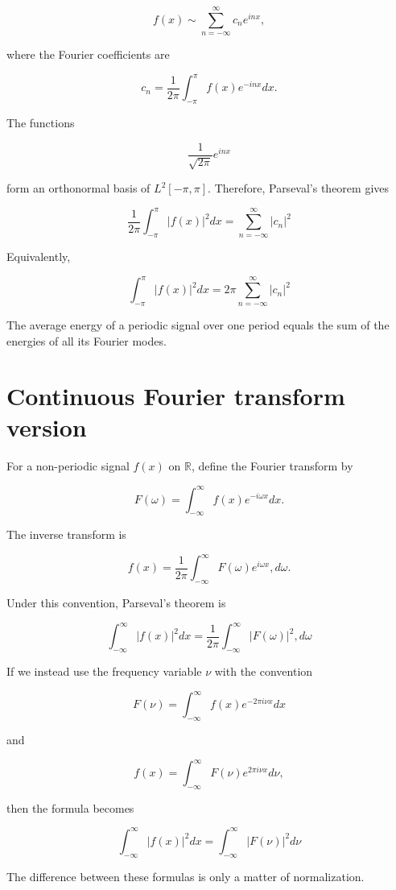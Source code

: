 \[
f(x)
\sim
\sum_{n=-\infty}^{\infty}
c_n e^{inx},
\]

where the Fourier coefficients are

\[
c_n=

\frac{1}{2\pi}
\int_{-\pi}^{\pi}
f(x)e^{-inx}dx.
\]

The functions

\[
\frac{1}{\sqrt{2\pi}}e^{inx}
\]

form an orthonormal basis of \(L^2[-\pi,\pi]\). Therefore, Parseval’s theorem gives

\[
\boxed{
\frac{1}{2\pi}
\int_{-\pi}^{\pi}
|f(x)|^2dx
=
\sum_{n=-\infty}^{\infty}
|c_n|^2
}
\]

Equivalently,

\[
\boxed{
\int_{-\pi}^{\pi}
|f(x)|^2dx
=
2\pi
\sum_{n=-\infty}^{\infty}
|c_n|^2
}
\]

The average energy of a periodic signal over one period equals the sum of the energies of all its Fourier modes.

\section{Continuous Fourier transform version}

For a non-periodic signal \(f(x)\) on \(\mathbb{R}\), define the Fourier transform by

\[
F(\omega)
=
\int_{-\infty}^{\infty}
f(x)e^{-i\omega x}dx.
\]

The inverse transform is

\[
f(x)
=
\frac{1}{2\pi}
\int_{-\infty}^{\infty}
F(\omega)e^{i\omega x},d\omega.
\]

Under this convention, Parseval’s theorem is

\[
\boxed{
\int_{-\infty}^{\infty}
|f(x)|^2dx
=
\frac{1}{2\pi}
\int_{-\infty}^{\infty}
|F(\omega)|^2,d\omega
}
\]

If we instead use the frequency variable \(\nu\) with the convention

\[
F(\nu)
=
\int_{-\infty}^{\infty}
f(x)e^{-2\pi i\nu x}dx
\]

and

\[
f(x)=
\int_{-\infty}^{\infty}
F(\nu)e^{2\pi i\nu x}d\nu,
\]

then the formula becomes

\[
\boxed{
\int_{-\infty}^{\infty}
|f(x)|^2dx
=
\int_{-\infty}^{\infty}
|F(\nu)|^2d\nu
}
\]

The difference between these formulas is only a matter of normalization.

